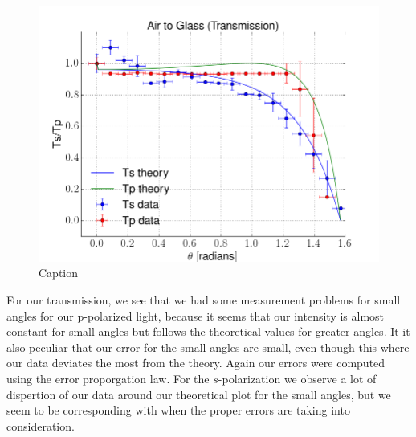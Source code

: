 \begin{figure}[h!]
    \centering
    \includegraphics[width=\columnwidth]{pst1}
    \caption{Caption}
    \label{fig:pst1}
\end{figure}

For our transmission, we see that we had some measurement problems for small angles for our p-polarized light, because it seems that our intensity is almost constant for small angles but follows the theoretical values for greater angles. It it also peculiar that our error for the small angles are small, even though this where our data deviates the most from the theory. Again our errors were computed using the error proporgation law. For the $s$-polarization we observe a lot of dispertion of our data around our theoretical plot for the small angles, but we seem to be corresponding with when the proper errors are taking into consideration.

